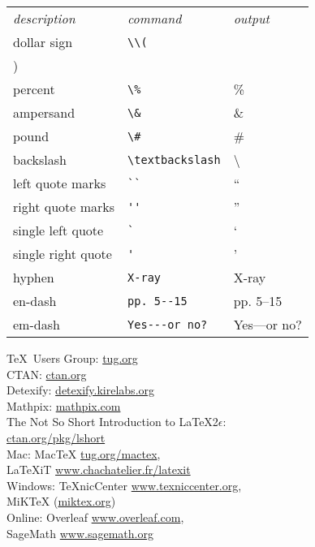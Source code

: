 \documentclass[10pt,landscape]{article}
\begin{document}
\begin{multicols}{3}
\begin{tabular}{lll}
\emph{description} & \emph{command} & \emph{output}\\
dollar sign & \verb!\\(! & \\) \\
percent & \verb!\%! & \% \\
ampersand & \verb!\&! & \& \\
pound & \verb!\#! & \# \\
backslash & \verb!\textbackslash! & \textbackslash \\
left quote marks & \verb!``! & `` \\
right quote marks & \verb!''! & '' \\
single left quote  & \verb!`! & ` \\
single right quote  & \verb!'! & ' \\
hyphen & \verb!X-ray! & X-ray\\
en-dash & \verb!pp. 5--15! & pp. 5--15 \\
em-dash & \verb!Yes---or no?! & Yes---or no? 
\end{tabular}

\begin{tcolorbox}[resourcebox, title=Resources]
\small
\TeX\ Users Group: \url{tug.org}\\
CTAN: \url{ctan.org}\\
Detexify: \url{detexify.kirelabs.org}\\
Mathpix: \url{mathpix.com}\\
The Not So Short Introduction to LaTeX2\(\epsilon\):\\ \hspace*{2em}\url{ctan.org/pkg/lshort}\\
Mac: MacTeX \url{tug.org/mactex},\\ \hspace*{2em}LaTeXiT \url{www.chachatelier.fr/latexit}\\
Windows: TeXnicCenter \url{www.texniccenter.org},\\ \hspace*{2em}MiKTeX (\url{miktex.org})\\
Online: Overleaf \url{www.overleaf.com},\\ \hspace*{2em}SageMath \url{www.sagemath.org}
\end{tcolorbox}
\end{multicols}
\end{document}
